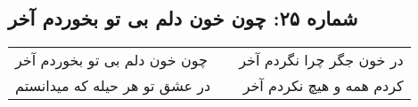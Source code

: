 \begin{center}
\section*{شماره ۲۵: چون خون دلم بی تو بخوردم آخر}
\label{sec:025}
\begin{longtable}{l p{0.5cm} r}
چون خون دلم بی تو بخوردم آخر
&&
در خون جگر چرا نگردم آخر
\\
در عشق تو هر حیله که میدانستم
&&
کردم همه و هیچ نکردم آخر
\\
\end{longtable}
\end{center}
